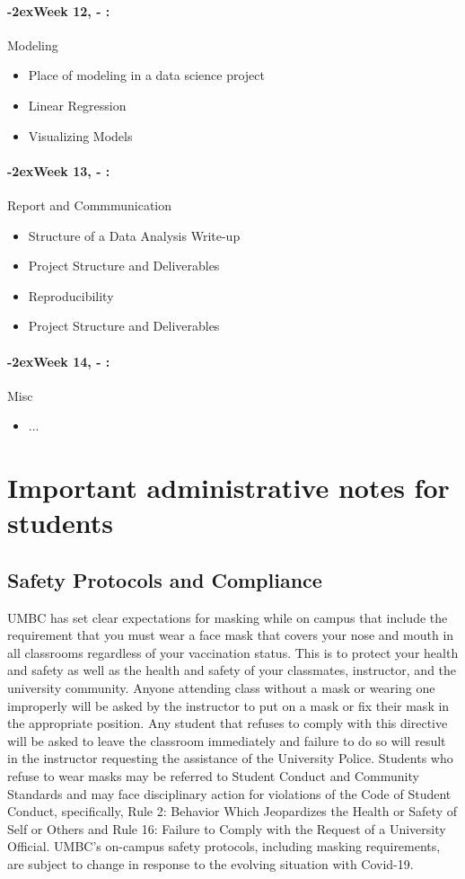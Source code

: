 \documentclass[11pt]{article}
\newcommand{\week}[1]{%
  \paragraph*{\kern-2ex\quad #1, \syldate{\today} - \AdvanceDate[4]\syldate{\today}:}%
  \ifdim\wd1=\wd\MONDAY
    \AdvanceDate[7]
  \else
    \AdvanceDate[7]
  \fi%
}
\begin{document}
\week{Week 12} Modeling
\begin{itemize}
\item Place of modeling in a data science project
\item Linear Regression
\item Visualizing Models
\end{itemize}

\week{Week 13} Report and Commmunication
\begin{itemize}
\item Structure of a Data Analysis Write-up
\item Project Structure and Deliverables
\item Reproducibility
\item Project Structure and Deliverables
\end{itemize}

\week{Week 14} Misc
\begin{itemize}
\item ...
\end{itemize}

\section*{Important administrative notes for students}

\subsection*{Safety Protocols and Compliance}
UMBC has set clear expectations for masking while on campus that include the requirement that you must wear a face mask that covers your nose and mouth in all classrooms regardless of your vaccination status. This is to protect your health and safety as well as the health and safety of your classmates, instructor, and the university community.   Anyone attending class without a mask or wearing one improperly will be asked by the instructor to put on a mask or fix their mask in the appropriate position. Any student that refuses to comply with this directive will be asked to leave the classroom immediately and failure to do so will result in the instructor requesting the assistance of the University Police. Students who refuse to wear masks may be referred to Student Conduct and Community Standards and may face disciplinary action for violations of the Code of Student Conduct, specifically, Rule 2: Behavior Which Jeopardizes the Health or Safety of Self or Others and Rule 16: Failure to Comply with the Request of a University Official. UMBC’s on-campus safety protocols, including masking requirements, are subject to change in response to the evolving situation with Covid-19.
\end{document}
